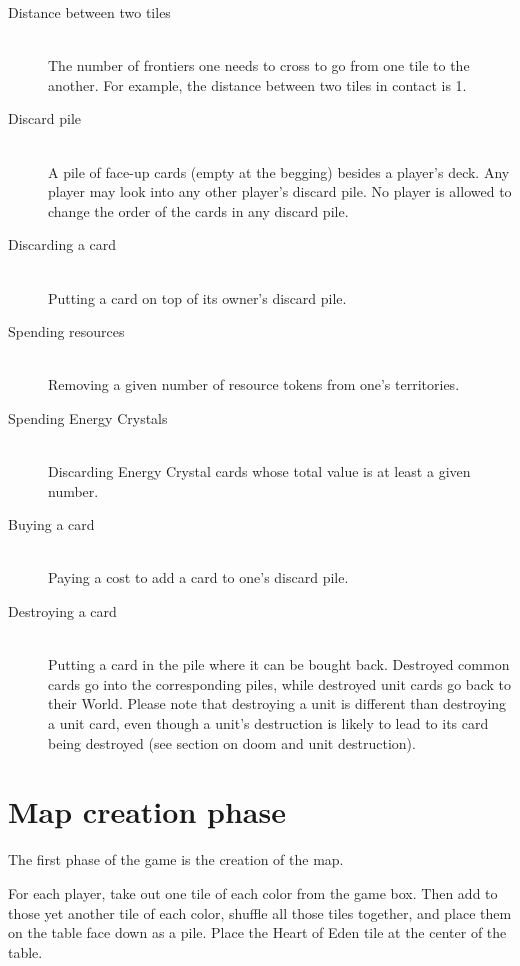 \documentclass[a4paper]{article}
\begin{document}
    \begin{description}
        \item[Distance between two tiles] \hfill \\
            The number of frontiers one needs to cross to go from one tile to the another.
            For example, the distance between two tiles in contact is 1.
        \item[Discard pile] \hfill \\
            A pile of face-up cards (empty at the begging) besides a player's deck.
            Any player may look into any other player's discard pile.
            No player is allowed to change the order of the cards in any discard pile.
        \item[Discarding a card] \hfill \\
            Putting a card on top of its owner's discard pile.
        \item[Spending resources] \hfill \\
            Removing a given number of resource tokens from one's territories.
        \item[Spending Energy Crystals] \hfill \\
            Discarding Energy Crystal cards whose total value is at least a given number.
        \item[Buying a card] \hfill \\
            Paying a cost to add a card to one's discard pile.
        \item[Destroying a card] \hfill \\
            Putting a card in the pile where it can be bought back.
            Destroyed common cards go into the corresponding piles,
            while destroyed unit cards go back to their World.
            Please note that destroying a unit is different than destroying
            a unit card, even though a unit's destruction is likely to lead to its
            card being destroyed (see section on doom and unit destruction).
    \end{description}


\newpage
\section{Map creation phase}

    The first phase of the game is the creation of the map.
    
    For each player, take out one tile of each color from the game box.
    Then add to those yet another tile of each color, shuffle all those tiles together,
    and place them on the table face down as a pile.
    Place the Heart of Eden tile at the center of the table.
    
\end{document}
